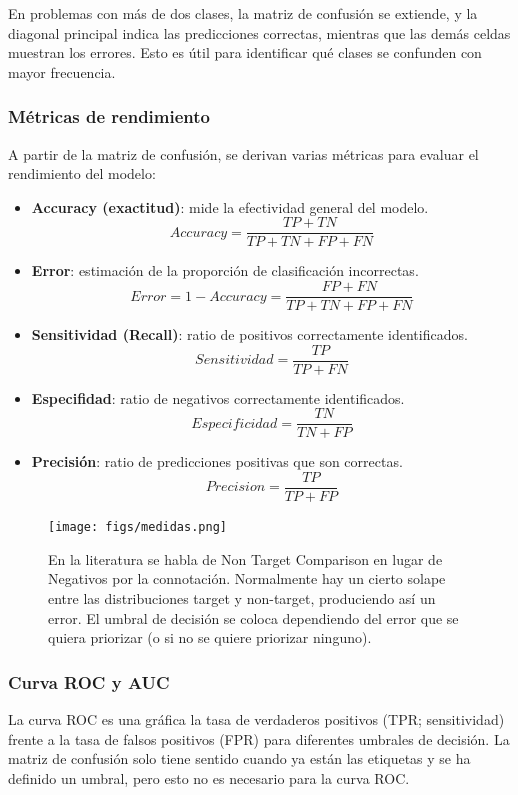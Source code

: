 En problemas con más de dos clases, la matriz de confusión se extiende, y la diagonal principal indica las predicciones correctas, mientras que las demás celdas muestran los errores. Esto es útil para identificar qué clases se confunden con mayor frecuencia.

\subsubsection{Métricas de rendimiento}
A partir de la matriz de confusión, se derivan varias métricas para evaluar el rendimiento del modelo:
\begin{itemize}
\item \textbf{Accuracy (exactitud)}: mide la efectividad general del modelo.
$$Accuracy = \frac{TP + TN}{TP + TN + FP + FN}$$

\item \textbf{Error}: estimación de la proporción de clasificación incorrectas.
$$Error = 1 - Accuracy = \frac{FP + FN}{TP + TN + FP + FN}$$

\item \textbf{Sensitividad (Recall)}: ratio de positivos correctamente identificados.
$$Sensitividad = \frac{TP}{TP + FN}$$

\item \textbf{Especifidad}: ratio de negativos correctamente identificados.
$$Especificidad = \frac{TN}{TN + FP}$$

\item \textbf{Precisión}: ratio de predicciones positivas que son correctas.
$$Precision = \frac{TP}{TP + FP}$$
\end{itemize}

\begin{figure}[h]
\centering
\texttt{[image: figs/medidas.png]}
\caption{En la literatura se habla de Non Target Comparison en lugar de Negativos por la connotación. Normalmente hay un cierto solape entre las distribuciones target y non-target, produciendo así un error. El umbral de decisión se coloca dependiendo del error que se quiera priorizar (o si no se quiere priorizar ninguno).}
\end{figure}

\subsubsection{Curva ROC y AUC}
La curva ROC es una gráfica la tasa de verdaderos positivos (TPR; sensitividad) frente a la tasa de falsos positivos (FPR) para diferentes umbrales de decisión. La matriz de confusión solo tiene sentido cuando ya están las etiquetas y se ha definido un umbral, pero esto no es necesario para la curva ROC. 

